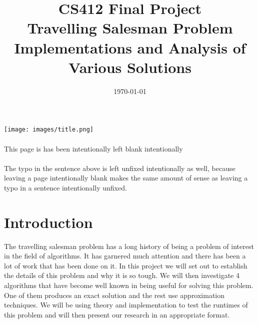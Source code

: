 \documentclass[11pt]{article}
\title
{%
  {\Huge CS412 Final Project \\
  \Huge Travelling Salesman Problem\\
    \huge Implementations and Analysis of Various Solutions}
}
\date{\Large \today}
\begin{document}
\maketitle
\centering
\texttt{[image: images/title.png]}
\newpage
\paragraph{}
\paragraph{}
\paragraph{}
\paragraph{}
\paragraph{}
\paragraph{}
\paragraph{}
\paragraph{}
\paragraph{}
\par \centering
This page is has been intentionally left blank intentionally \paragraph{}
The typo in the sentence above is left unfixed intentionally as well, because leaving a page intentionally blank makes the same amount of sense as leaving a typo in a sentence intentionally unfixed. 
\par \flushleft

\newpage
\tableofcontents

\newpage


\newpage
\section{Introduction}
The travelling salesman problem has a long history of being a problem of interest in the field of algorithms. It has garnered much attention and there has been a lot of work that has been done on it. In this project we will set out to establish the details of this problem and why it is so tough. We will then investigate 4 algorithms that have become well known in being useful for solving this problem. One of them produces an exact solution and the rest use approximation techniques. We will be using theory and implementation to test the runtimes of this problem and will then present our research in an appropriate format.
\end{document}
